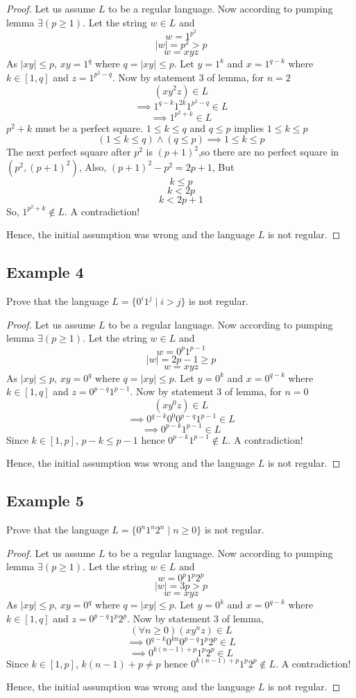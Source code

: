 \documentclass{article}
\begin{document}
\begin{proof}
Let us assume $L$ to be a regular language. Now according to pumping lemma $\exists(p\ge1)$.
Let the string $w\in L$ and $$w=1^{p^2}$$ $$\mid w\mid=p^2>p $$ $$w=xyz$$
As $\mid xy\mid\le p$, $xy=1^q$ where $q=\mid xy\mid\le p$. Let $y=1^k$ and $x=1^{q-k}$ where $k\in[1,q]$ and $z=1^{p^2-q}$.
Now by statement 3 of lemma, for $n=2$
$$(xy^2z)\in L$$
$$\implies 1^{q-k}1^{2k}1^{p^2-q}\in L$$
$$\implies 1^{p^2+k}\in L$$
$p^2+k$ must be a perfect square. $1\le k\le q$ and $q\le p$ implies $1\le k\le p$ 
$$(1\le k\le q)\wedge (q\le p)\implies 1\le k\le p$$
The next perfect square after $p^2$ is $(p+1)^2$,so there are no perfect square in $(p^2,(p+1)^2)$, Also, $(p+1)^2-p^2=2p+1$, But
$$k\le p$$
$$k< 2p$$
$$k< 2p+1$$
So, $1^{p^2+k}\notin L$. A contradiction!

Hence, the initial assumption was wrong and the language $L$ is not regular.
\end{proof}

\subsection{Example 4}

Prove that the language $L=\{0^i1^j\mid i>j\}$ is not regular.

\begin{proof}
Let us assume $L$ to be a regular language. Now according to pumping lemma $\exists(p\ge1)$.
Let the string $w\in L$ and $$w=0^p1^{p-1}$$ $$\mid w\mid=2p-1\ge p $$ $$w=xyz$$
As $\mid xy\mid\le p$, $xy=0^q$ where $q=\mid xy\mid\le p$. Let $y=0^k$ and $x=0^{q-k}$ where $k\in[1,q]$ and $z=0^{p-q}1^{p-1}$.
Now by statement 3 of lemma, for $n=0$
$$(xy^0z)\in L$$
$$\implies 0^{q-k}0^{0}0^{p-q}1^{p-1}\in L$$
$$\implies 0^{p-k}1^{p-1}\in L$$
Since $k\in[1,p]$, $p-k\le p-1$ hence $0^{p-k}1^{p-1}\notin L$. A contradiction!

Hence, the initial assumption was wrong and the language $L$ is not regular.
\end{proof}

\subsection{Example 5}

Prove that the language $L=\{0^n1^n2^n\mid n\ge0\}$ is not regular.

\begin{proof}
Let us assume $L$ to be a regular language. Now according to pumping lemma $\exists(p\ge1)$.
Let the string $w\in L$ and $$w=0^p1^p2^p$$ $$\mid w\mid=3p>p $$ $$w=xyz$$
As $\mid xy\mid\le p$, $xy=0^q$ where $q=\mid xy\mid\le p$. Let $y=0^k$ and $x=0^{q-k}$ where $k\in[1,q]$ and $z=0^{p-q}1^p2^p$.
Now by statement 3 of lemma,
$$(\forall n\ge0)(xy^nz)\in L$$
$$\implies 0^{q-k}0^{kn}0^{p-q}1^p2^p\in L$$
$$\implies 0^{k(n-1)+p}1^p2^p\in L$$
Since $k\in[1,p]$, $k(n-1)+p\ne p$ hence $0^{k(n-1)+p}1^p2^p\notin L$. A contradiction!

Hence, the initial assumption was wrong and the language $L$ is not regular.
\end{proof}
\end{document}
